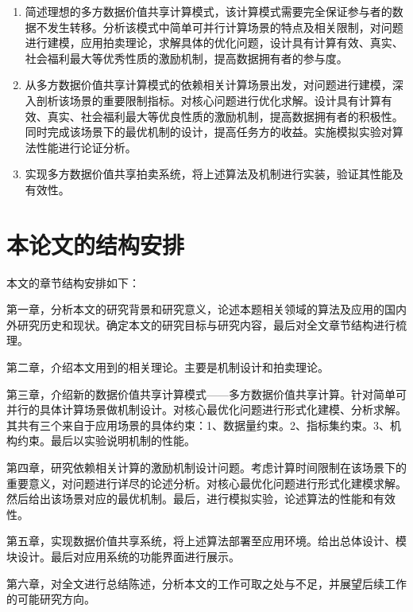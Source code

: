 \documentclass[promaster]{thesis-uestc}
\begin{document}
\begin{enumerate}
    \item 简述理想的多方数据价值共享计算模式，该计算模式需要完全保证参与者的数据不发生转移。分析该模式中简单可并行计算场景的特点及相关限制，对问题进行建模，应用拍卖理论，求解具体的优化问题，设计具有计算有效、真实、社会福利最大等优秀性质的激励机制，提高数据拥有者的参与度。
    \item 从多方数据价值共享计算模式的依赖相关计算场景出发，对问题进行建模，深入剖析该场景的重要限制指标。对核心问题进行优化求解。设计具有计算有效、真实、社会福利最大等优良性质的激励机制，提高数据拥有者的积极性。同时完成该场景下的最优机制的设计，提高任务方的收益。实施模拟实验对算法性能进行论证分析。
    \item 实现多方数据价值共享拍卖系统，将上述算法及机制进行实装，验证其性能及有效性。
\end{enumerate}


\section{本论文的结构安排}

本文的章节结构安排如下：

第一章，分析本文的研究背景和研究意义，论述本题相关领域的算法及应用的国内外研究历史和现状。确定本文的研究目标与研究内容，最后对全文章节结构进行梳理。

第二章，介绍本文用到的相关理论。主要是机制设计和拍卖理论。

第三章，介绍新的数据价值共享计算模式——多方数据价值共享计算。针对简单可并行的具体计算场景做机制设计。对核心最优化问题进行形式化建模、分析求解。其共有三个来自于应用场景的具体约束：1、数据量约束。2、指标集约束。3、机构约束。最后以实验说明机制的性能。

第四章，研究依赖相关计算的激励机制设计问题。考虑计算时间限制在该场景下的重要意义，对问题进行详尽的论述分析。对核心最优化问题进行形式化建模求解。然后给出该场景对应的最优机制。最后，进行模拟实验，论述算法的性能和有效性。

第五章，实现数据价值共享系统，将上述算法部署至应用环境。给出总体设计、模块设计。最后对应用系统的功能界面进行展示。

第六章，对全文进行总结陈述，分析本文的工作可取之处与不足，并展望后续工作的可能研究方向。

\end{document}
